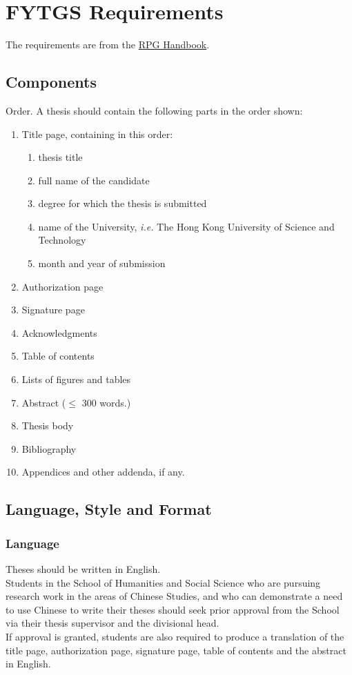 \chapter{FYTGS Requirements}
\label{chap:thesis-preparation}

The requirements are from the \href{https://rpghandbook.hkust.edu.hk/appendices-guidelines-on-thesis-preparation}{RPG Handbook}.

\section{Components}

Order. A thesis should contain the following parts in the order shown:

\begin{enumerate}
  \item Title page, containing in this order:
    \begin{enumerate}
      \item thesis title
      \item full name of the candidate
      \item degree for which the thesis is submitted
      \item name of the University, \emph{i.e.} The Hong Kong University of Science and Technology
      \item month and year of submission
    \end{enumerate}
  \item Authorization page
  \item Signature page
  \item Acknowledgments
  \item Table of contents
  \item Lists of figures and tables
  \item Abstract ($\leq$ 300 words.)
  \item Thesis body
  \item Bibliography
  \item Appendices and other addenda, if any.
\end{enumerate}

\section{Language, Style and Format}

\subsection{Language}
Theses should be written in English.\\
Students in the School of Humanities and Social Science who are pursuing research work in the areas of Chinese Studies, and who can demonstrate a need to use Chinese to write their theses should seek prior approval from the School via their thesis supervisor and the divisional head.\\
If approval is granted, students are also required to produce a translation of the title page, authorization page, signature page, table of contents and the abstract in English.

